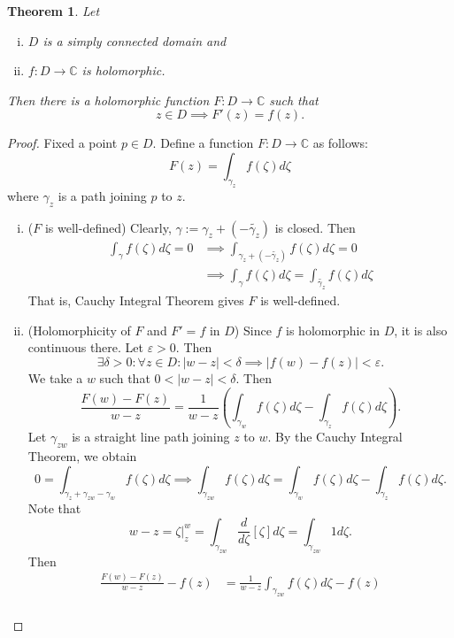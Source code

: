\documentclass[12pt,openany]{book}
\newtheorem{theorem}{Theorem}[chapter]
\theoremstyle{definition}
\newcommand{\C}{\mathbb{C}}
\newcommand{\of}[1]{\left( #1 \right)}
\newcommand{\abs}[1]{\left\lvert #1 \right\rvert}
\begin{document}
	
	\begin{tcolorbox}[colback=white,colframe=thmcolor,arc=5pt,title={\color{white}\bf Anti-derivative Theorem}]
		\begin{theorem}
			Let \begin{enumerate}[(i)]
				\item $D$ is a simply connected domain and
				\item $f:D\to\C$ is holomorphic.
			\end{enumerate} Then there is a holomorphic function $F:D\to\C$ such that \[
			z\in D\implies F'\of{z}=f\of{z}.
			\]
		\end{theorem}
	\end{tcolorbox}
	\begin{proof}
		Fixed a point $p\in D$. Define a function $F:D\to\C$ as follows: \[
		F\of{z}=\int_{\gamma_z}f\of{\zeta}d\zeta
		\] where $\gamma_z$ is a path joining $p$ to $z$. \begin{enumerate}[(i)]
			\item ($F$ is well-defined) Clearly, $\gamma:=\gamma_z+\of{-\tilde{\gamma_z}}$ is closed. Then
			\begin{align*}
				\int_{\gamma}f\of{\zeta}d\zeta=0&\implies \int_{\gamma_z+\of{-\tilde{\gamma_z}}}f\of{\zeta}d\zeta=0\\
				&\implies\int_{\gamma}f\of{\zeta}d\zeta=\int_{\tilde{\gamma_z}}f\of{\zeta}d\zeta
			\end{align*} That is, Cauchy Integral Theorem gives $F$ is well-defined.
			\item (Holomorphicity of $F$ and $F'=f$ in $D$) Since $f$ is holomorphic in $D$, it is also continuous there. Let $\varepsilon>0$. Then \[
			\exists\delta>0:\forall z\in D:\abs{w-z}<\delta\implies\abs{f\of{w}-f\of{z}}<\varepsilon.
			\] We take a $w$ such that $0<\abs{w-z}<\delta$. Then \[
			\frac{F\of{w}-F\of{z}}{w-z}=\frac{1}{w-z}\of{\int_{\gamma_w}f\of{\zeta}d\zeta-\int_{\gamma_z}f\of{\zeta}d\zeta}.
			\] Let $\gamma_{zw}$ is a straight line path joining $z$ to $w$. By the Cauchy Integral Theorem, we obtain \[
			0=\int_{\gamma_z+\gamma_{zw}-\gamma_w}f\of{\zeta}d\zeta\implies\int_{\gamma_{zw}}f\of{\zeta}d\zeta=\int_{\gamma_w}f\of{\zeta}d\zeta-\int_{\gamma_z}f\of{\zeta}d\zeta.
			\] Note that \[
			w-z=\zeta\bigg|_z^w=\int_{\gamma_{zw}}\frac{d}{d\zeta}\left[\zeta\right] d\zeta=\int_{\gamma_{zw}}1d\zeta.
			\]Then \begin{align*}
				\frac{F\of{w}-F\of{z}}{w-z}-f\of{z}&=\frac{1}{w-z}\int_{\gamma_{zw}}f\of{\zeta}d\zeta-f\of{z}\\

\end{align*}
\end{enumerate}
\end{proof}
\end{document}
